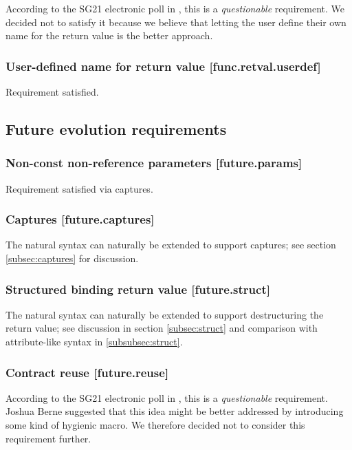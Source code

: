 According to the SG21 electronic poll in \cite{P2885R3}, this is a \emph{questionable} requirement. We decided not to satisfy it because we believe that letting the user define their own name for the return value is the better approach.

\subsubsection{User-defined name for return value  [func.retval.userdef]}

Requirement satisfied.

\subsection{Future evolution requirements}

\subsubsection{Non-const non-reference parameters  [future.params]}

Requirement satisfied via captures.

\subsubsection{Captures  [future.captures]}

The natural syntax can naturally be extended to support captures; see section \ref{subsec:captures} for discussion.

\subsubsection{Structured binding return value  [future.struct]}

The natural syntax can naturally be extended to support destructuring the return value; see discussion in section \ref{subsec:struct} and comparison with attribute-like syntax in \ref{subsubsec:struct}.

\subsubsection{Contract reuse  [future.reuse]}

According to the SG21 electronic poll in \cite{P2885R3}, this is a \emph{questionable} requirement. Joshua Berne suggested that this idea might be better addressed by introducing some kind of hygienic macro. We therefore decided not to consider this requirement further.

